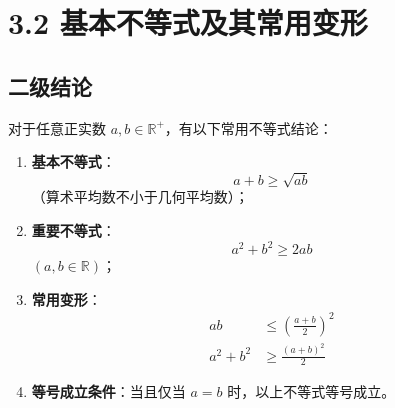 \documentclass{article}
\begin{document}
\section*{3.2 基本不等式及其常用变形}

\subsection*{二级结论}

对于任意正实数 \(a, b \in \mathbb{R}^+\)，有以下常用不等式结论：

\begin{enumerate}
    \item \textbf{基本不等式}：
    \[
    a + b \geq \sqrt{ab}
    \]
    （算术平均数不小于几何平均数）；

    \item \textbf{重要不等式}：
    \[
    a^2 + b^2 \geq 2ab
    \]
    \((a, b \in \mathbb{R})\)；

    \item \textbf{常用变形}：
    \begin{align*}
        ab &\leq \left(\frac{a+b}{2}\right)^2 \\
        a^2 + b^2 &\geq \frac{(a+b)^2}{2}
    \end{align*}

    \item \textbf{等号成立条件}：当且仅当 \(a = b\) 时，以上不等式等号成立。
\end{enumerate}
\end{document}
